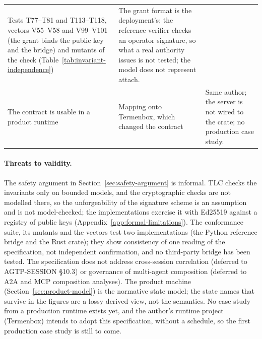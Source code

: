\begin{table}[htbp]
\begin{tabularx}{\columnwidth}{X X X}
Tests T77--T81 and T113--T118, vectors V55--V58 and V99--V101 (the grant binds the public key and the bridge) and mutants of the check
(Table~\ref{tab:invariant-independence}) &
The grant format is the deployment's; the reference verifier checks an
operator signature, so what a real authority issues is not tested; the
model does not represent attach. \\
The contract is usable in a product runtime &
Mapping onto Termenbox, which changed the contract &
Same author; the server is not wired to the crate; no production case
study. \\
\bottomrule
\end{tabularx}
\end{table}

\paragraph{Threats to validity.} The safety argument in
Section~\ref{sec:safety-argument} is informal. TLC checks the invariants
only on bounded models, and the cryptographic checks are not modelled
there, so the unforgeability of the signature scheme is an assumption
and is not model-checked; the implementations exercise it with Ed25519
against a registry of public keys (Appendix~\ref{app:formal-limitations}). The conformance suite,
its mutants and the vectors test two implementations (the Python
reference bridge and the Rust crate); they show consistency of one reading
of the specification, not independent confirmation, and no third-party
bridge has been tested. The specification
does not address cross-session correlation (deferred to
AGTP-SESSION \S 10.3) or governance of multi-agent composition
(deferred to A2A and MCP composition analyses). The product machine
(Section~\ref{sec:product-model}) is the normative state model; the
state names that survive in the figures are a lossy derived view,
not the semantics. No case study from a production runtime exists yet,
and the author's runtime project (Termenbox) intends to adopt this
specification, without a schedule, so the first production case study is still to come.

